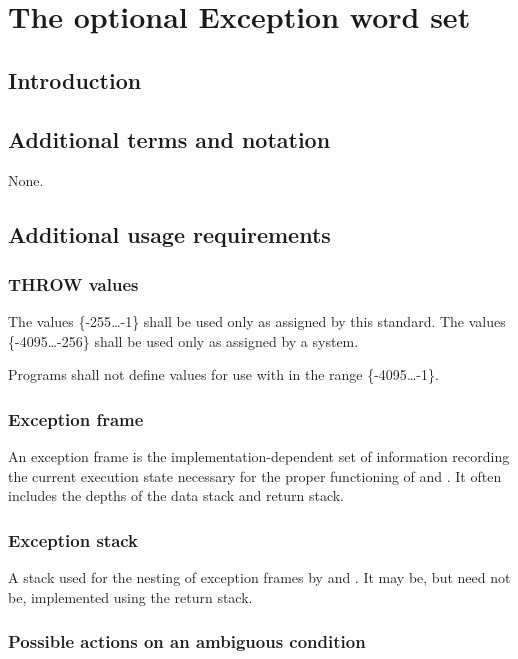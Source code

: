 \chapter{The optional Exception word set} %

\section{Introduction} %

\section{Additional terms and notation} %
None.

\section{Additional usage requirements} %

\subsection{THROW values} %
\label{exception:throw}

The  values \{-255{\ldots}-1\} shall be used only as
assigned by this standard. The values \{-4095{\ldots}-256\}
shall be used only as assigned by a system.

Programs shall not define values for use with  in the
range \{-4095{\ldots}-1\}.

\subsection{Exception frame} %

An exception frame is the implementation-dependent set of
information recording the current execution state necessary for
the proper functioning of  and . It often
includes the depths of the data stack and return stack.

\subsection{Exception stack} %

A stack used for the nesting of exception frames by 
and . It may be, but need not be, implemented using
the return stack.


\subsection{Possible actions on an ambiguous condition} %
\label{exception:ambiguous}

